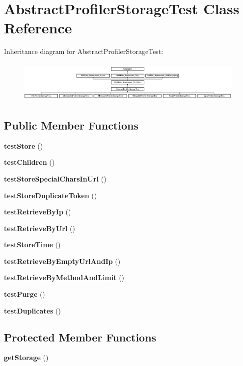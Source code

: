 \section{Abstract\+Profiler\+Storage\+Test Class Reference}
\label{class_symfony_1_1_component_1_1_http_kernel_1_1_tests_1_1_profiler_1_1_abstract_profiler_storage_test}
Inheritance diagram for Abstract\+Profiler\+Storage\+Test\+:\begin{figure}[H]
\begin{center}
\leavevmode
\includegraphics[height=2.064897cm]{class_symfony_1_1_component_1_1_http_kernel_1_1_tests_1_1_profiler_1_1_abstract_profiler_storage_test}
\end{center}
\end{figure}
\subsection*{Public Member Functions}
\begin{DoxyCompactItemize}
\item 
{\bf test\+Store} ()
\item 
{\bf test\+Children} ()
\item 
{\bf test\+Store\+Special\+Chars\+In\+Url} ()
\item 
{\bf test\+Store\+Duplicate\+Token} ()
\item 
{\bf test\+Retrieve\+By\+Ip} ()
\item 
{\bf test\+Retrieve\+By\+Url} ()
\item 
{\bf test\+Store\+Time} ()
\item 
{\bf test\+Retrieve\+By\+Empty\+Url\+And\+Ip} ()
\item 
{\bf test\+Retrieve\+By\+Method\+And\+Limit} ()
\item 
{\bf test\+Purge} ()
\item 
{\bf test\+Duplicates} ()
\end{DoxyCompactItemize}
\subsection*{Protected Member Functions}
\begin{DoxyCompactItemize}
\item 
{\bf get\+Storage} ()
\end{DoxyCompactItemize}
